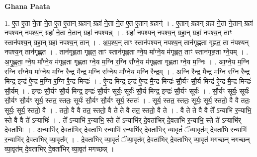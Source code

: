 \documentclass[17pt]{extarticle}
\begin{document}
\textbf{Ghana Paata } \newline

1. ए॒त ए॒ता ने॒ता ने॒त ए॒त ए॒तान् ग्रहा॒न् ग्रहा॑ ने॒ता ने॒त ए॒त ए॒तान् ग्रहान्॑ । . ए॒तान् ग्रहा॒न् ग्रहा॑ ने॒ता ने॒तान् ग्रहा॑ नपश्यन् नपश्य॒न् ग्रहा॑ ने॒ता ने॒तान् ग्रहा॑ नपश्यन्न् । . ग्रहा॑ नपश्यन् नपश्य॒न् ग्रहा॒न् ग्रहा॑ नपश्य॒न् ताꣳ स्तान॑पश्य॒न् ग्रहा॒न् ग्रहा॑ नपश्य॒न् तान् । . अ॒प॒श्य॒न् ताꣳ स्तान॑पश्यन् नपश्य॒न् तान॑गृह्णता गृह्णत॒ ता न॑पश्यन् नपश्य॒न् तान॑गृह्णत । . तान॑गृह्णता गृह्णत॒ ताꣳ स्तान॑गृह्णता ग्ने॒य मा᳚ग्ने॒य म॑गृह्णत॒ ताꣳ स्तान॑गृह्णता ग्ने॒यम् । . अ॒गृ॒ह्ण॒ता॒ ग्ने॒य मा᳚ग्ने॒य म॑गृह्णता गृह्णता ग्ने॒य म॒ग्नि र॒ग्नि रा᳚ग्ने॒य म॑गृह्णता गृह्णता ग्ने॒य म॒ग्निः । . आ॒ग्ने॒य म॒ग्नि र॒ग्नि रा᳚ग्ने॒य मा᳚ग्ने॒य म॒ग्नि रै॒न्द्र मै॒न्द्र म॒ग्नि रा᳚ग्ने॒य मा᳚ग्ने॒य म॒ग्नि रै॒न्द्रम् । . अ॒ग्नि रै॒न्द्र मै॒न्द्र म॒ग्नि र॒ग्नि रै॒न्द्र मिन्द्र॒ इन्द्र॑ ऐ॒न्द्र म॒ग्नि र॒ग्नि रै॒न्द्र मिन्द्रः॑ । . ऐ॒न्द्र मिन्द्र॒ इन्द्र॑ ऐ॒न्द्र मै॒न्द्र मिन्द्रः॑ सौ॒र्यꣳ सौ॒र्य मिन्द्र॑ ऐ॒न्द्र मै॒न्द्र मिन्द्रः॑ सौ॒र्यम् । . इन्द्रः॑ सौ॒र्यꣳ सौ॒र्य मिन्द्र॒ इन्द्रः॑ सौ॒र्यꣳ सूर्यः॒ सूर्यः॑ सौ॒र्य मिन्द्र॒ इन्द्रः॑ सौ॒र्यꣳ सूर्यः॑ । . सौ॒र्यꣳ सूर्यः॒ सूर्यः॑ सौ॒र्यꣳ सौ॒र्यꣳ सूर्य॒ स्तत॒ स्ततः॒ सूर्यः॑ सौ॒र्यꣳ सौ॒र्यꣳ सूर्य॒ स्ततः॑ । . सूर्य॒ स्तत॒ स्ततः॒ सूर्यः॒ सूर्य॒ स्ततो॒ वै वै ततः॒ सूर्यः॒ सूर्य॒ स्ततो॒ वै । . ततो॒ वै वै तत॒ स्ततो॒ वै ते ते वै तत॒ स्ततो॒ वै ते । . वै ते ते वै वै ते᳚ ऽन्याभि॑ र॒न्याभि॒ स्ते वै वै ते᳚ ऽन्याभिः॑ । . ते᳚ ऽन्याभि॑ र॒न्याभि॒ स्ते ते᳚ ऽन्याभि॑र् दे॒वता॑भिर् दे॒वता॑भि र॒न्याभि॒ स्ते ते᳚ ऽन्याभि॑र् दे॒वता॑भिः । . अ॒न्याभि॑र् दे॒वता॑भिर् दे॒वता॑भि र॒न्याभि॑ र॒न्याभि॑र् दे॒वता॑भिर् व्या॒वृतं॑ ॅव्या॒वृत॑म् दे॒वता॑भि र॒न्याभि॑ र॒न्याभि॑र् दे॒वता॑भिर् व्या॒वृत᳚म् । . दे॒वता॑भिर् व्या॒वृतं॑ ॅव्या॒वृत॑म् दे॒वता॑भिर् दे॒वता॑भिर् व्या॒वृत॑ मगच्छन् नगच्छन् व्या॒वृत॑म् दे॒वता॑भिर् दे॒वता॑भिर् व्या॒वृत॑ मगच्छन्न् । \newline
\end{document}
